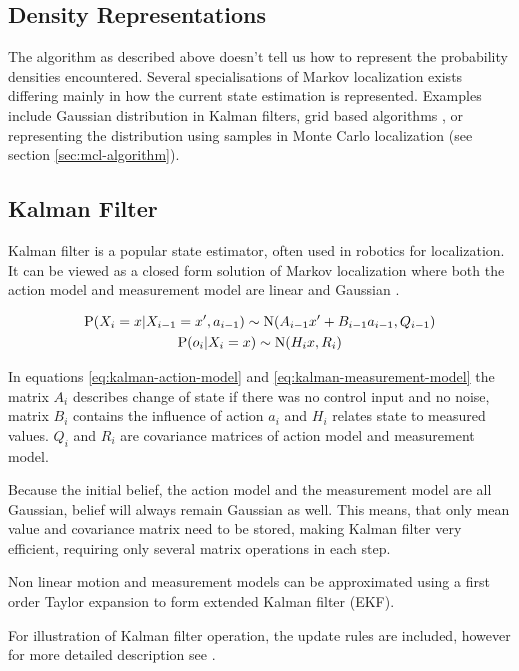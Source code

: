 \subsection{Density Representations}
The algorithm as described above doesn't tell us how to represent the probability
densities encountered.
Several specialisations of Markov localization exists differing mainly in how the
current state estimation is represented.
Examples include Gaussian distribution in Kalman filters,
grid based algorithms \cite{fox98}, or representing the distribution
using samples in Monte Carlo localization (see section \ref{sec:mcl-algorithm}).

\subsection{Kalman Filter}
\label{sec:kalman}
Kalman filter \cite{kalman60,welch95} is a popular state estimator, often used in robotics
for localization.
It can be viewed as a closed form solution of Markov localization where both the
action model and measurement model are linear and Gaussian \cite{diard03}.

\begin{gather}
	\label{eq:kalman-action-model}
	\P(X_i = x | X_{i-1} = x', a_{i - 1}) \sim \mathrm{N}(A_{i - 1}x' + B_{i - 1}a_{i - 1}, Q_{i - 1})
	\\
	\label{eq:kalman-measurement-model}
	\P(o_{i} | X_i = x) \sim \mathrm{N}(H_{i}x, R_i)
\end{gather}

In equations \eqref{eq:kalman-action-model} and \eqref{eq:kalman-measurement-model}
the matrix \(A_i\) describes change of state if there was no control input and no noise,
matrix \(B_i\) contains the influence of action \(a_i\) and \(H_i\) relates state to measured
values.
\(Q_i\) and \(R_i\) are covariance matrices of action model and measurement model.

Because the initial belief, the action model and the measurement model are all Gaussian,
belief will always remain Gaussian as well.
This means, that only mean value and covariance matrix need to be stored, making
Kalman filter very efficient, requiring only several matrix operations in each step.

Non linear motion and measurement models can be approximated
using a first order Taylor expansion to form extended Kalman
filter (EKF).

For illustration of Kalman filter operation, the update rules are included,
however for more detailed description see \cite{welch95}.

